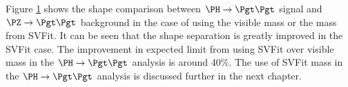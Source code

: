 Figure \ref{fig:svfit} shows the shape comparison between $\PH\to\Pgt\Pgt$ signal
and $\PZ \to \Pgt\Pgt$ background in the case of using the visible mass or the mass from SVFit. It can
be seen that the shape separation is greatly improved in the SVFit case.
The improvement in expected limit from using SVFit over visible mass in the $\PH
\to \Pgt\Pgt$ analysis is around 40$\%$. The use of SVFit mass in the
$\PH\to\Pgt\Pgt$ analysis is discussed further in the next chapter.

\begin{figure}
\begin{center}
\end{center}
\caption{
}
\label{fig:svfit}
\end{figure}





